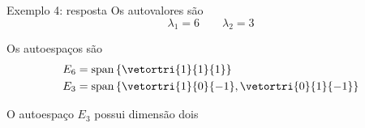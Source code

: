 \begin{resolution}{Exemplo 4: resposta}
    Os autovalores são
    \[
        \lambda_{1}=6
        \qquad
        \lambda_{2}=3
    \]

    Os autoespaços são
    \begin{align*}
        E_{6}&=
        \operatorname{span}
        \left\{\vetortri{1}{1}{1}\right\}\\
        E_{3}&=
        \operatorname{span}
        \left\{
            \vetortri{1}{0}{-1}
            ,
            \vetortri{0}{1}{-1}
        \right\}
    \end{align*}

    O autoespaço $E_{3}$ possui dimensão dois
\end{resolution}